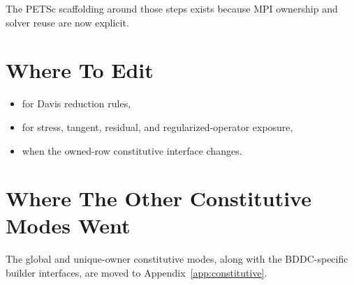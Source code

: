The PETSc scaffolding around those steps exists because MPI ownership and solver
reuse are now explicit.

\section{Where To Edit}

\begin{itemize}
\item {} for Davis reduction rules,
\item {} for stress, tangent, residual, and
regularized-operator exposure,
\item {} when the owned-row constitutive
interface changes.
\end{itemize}

\section{Where The Other Constitutive Modes Went}

The global and unique-owner constitutive modes, along with the BDDC-specific
builder interfaces, are moved to Appendix~\ref{app:constitutive}.
